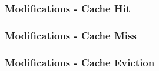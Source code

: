 \documentclass{beamer}
\begin{document}
\begin{frame}
  \frametitle{Modifications - Cache Hit}

  \begin{adjustbox}{width=\textwidth,keepaspectratio}
    
  \end{adjustbox}

\end{frame}

\begin{frame}
  \frametitle{Modifications - Cache Miss}

  \begin{adjustbox}{width=\textwidth,keepaspectratio}
    
  \end{adjustbox}

\end{frame}

\begin{frame}
  \frametitle{Modifications - Cache Eviction}

  \begin{adjustbox}{width=\textwidth,keepaspectratio}
    
  \end{adjustbox}

\end{frame}
\end{document}

